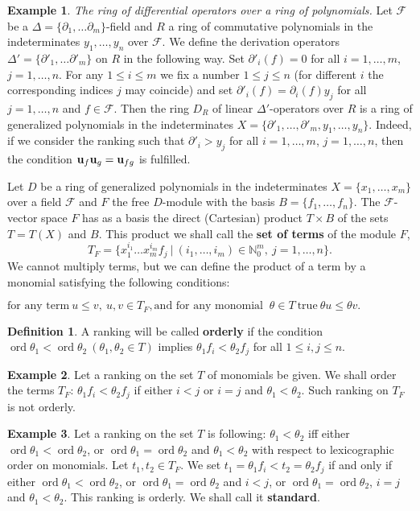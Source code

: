 \documentclass[a4paper,reqno,12pt]{amsart}
\theoremstyle{plain}
\theoremstyle{remark}
\theoremstyle{definition}
\newtheorem{example}{Example}
\newtheorem{definition}{Definition}
\renewcommand{\le}{\leqslant}
\DeclareMathOperator {\ord}{ord}
\def\u{\bold {u}}
\newcommand{\N}{\mathbb{N}}
\def\ord{\operatorname{ord}}
\def\F{\mathcal {F}}
\begin{document}
\begin{example}\label{4.1.12} {\it The ring of 
differential operators over a ring of
polynomials.}
Let $\F$ be a  $\Delta=\{\partial_1,\dots \partial_m\}$-field 
and $R$ a ring of commutative polynomials in
the indeterminates $y_1,\dots,y_n$ over $\F$. 
We define the derivation
operators $\Delta'=\{\partial'_1,\dots \partial'_m\}$ on $R$ 
in the following way. Set   $\partial'_i(f)=0$ for all
$i=1,\dots,m$,  $j=1,\dots,n$. For any
$1\le i\le m$ we fix a number $1\le j\le n$ (for different $i$ the corresponding indices $j$ may coincide) and set 
$\partial'_i(f)=\partial_i(f)y_j$ for
all $j=1,\dots,n$ and $f\in \F$. 
Then the ring $D_R$ of linear
$\Delta'$-operators over $R$ is a ring of generalized polynomials in
the indeterminates $X=\{\partial'_1,\dots,\partial'_m,y_1,\dots,y_n\}$. 
Indeed, if we
consider the ranking such that $\partial'_i>y_j$ 
for all $i=1,\dots,m$,
$j=1,\dots,n$, then the condition $\u_f\u_g=\u_{f g}$ is 
fulfilled.
\end{example}
Let $D$ be a ring of generalized polynomials in the indeterminates
$X=\{x_1,\dots,x_m\}$ over a field $\F$ and $F$ the free
$D$-module with the basis $B=\{f_1,\dots,f_n\}$. The $\F$-vector space
$F$ has as a basis the direct (Cartesian) product $T\times B$ of the
sets $T=T(X)$ and $B$. This product we shall call the {\bf set of terms} 
of   the module $F$,
$$
T_F=\{x_1^{i_1}\dots x_m^{i_m}f_j\ |\ (i_1,\dots,i_m)\in\N_0^m,\
  j=1,\dots,n\}.
$$
We cannot multiply terms, but we can define the product of a term by a
monomial satisfying the following conditions:

$ 
  \text{for any term}\ u\leq v, \ u,v\in T_F,\text{and for any  monomial }
\ \theta\in T
\ \text{true}\  \theta u\leq \theta v.
$

\begin{definition}\label{4.1.11}
A ranking will be called {\bf orderly} if the condition 
$\ord\theta_1<\ord\theta_2\
(\theta_1,\theta_2\in T)$ implies $\theta_1 f_i<\theta_2 f_j$ for all 
$1\leq  i,j\leq n$.
\end{definition}

\begin{example}\label{4.1.12}
Let a ranking on the set $T$ of monomials be given. 
We shall order the
terms  $T_F$:  $\theta_1f_i<\theta_2f_j$
if either $i<j$ or $i=j$ and  $\theta_1<\theta_2$.
Such ranking on $T_F$ is not orderly.
\end{example}

\begin{example}\label{4.1.13}
Let   a ranking  on the set $T$  is following:
$\theta_1<\theta_2$ iff  either
$\ord\theta_1<\ord\theta_2$, or $\ord\theta_1=\ord\theta_2$
and $\theta_1<\theta_2$   with respect to lexicographic order 
on monomials.
Let
$t_1,t_2\in T_F$. 
We set $t_1=\theta_1f_i<t_2=\theta_2f_j$ if
and only if
 either 
$\ord\theta_1<\ord\theta_2$,
or $\ord\theta_1=\ord\theta_2$ and $i<j$,
or $\ord\theta_1=\ord\theta_2$, 
$i=j$ and $\theta_1<\theta_2$.
This ranking is orderly. We shall call it {\bf standard}.
\end{example}
\end{document}
